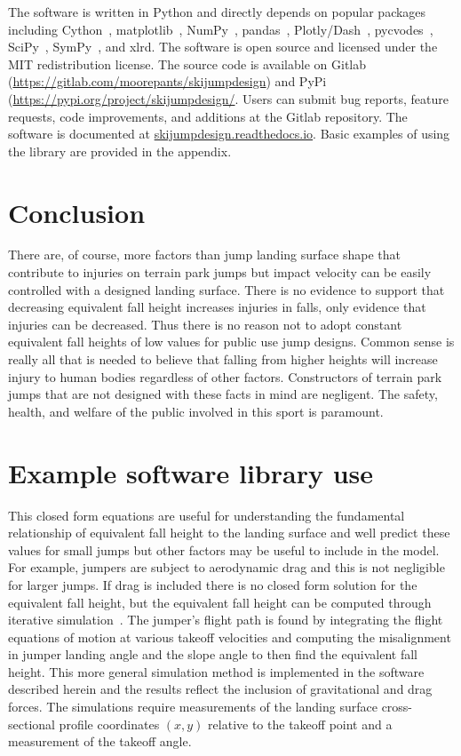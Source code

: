 \documentclass{article}
\begin{document}
The software is written in Python and directly depends on popular packages
including Cython~\cite{Behnel2011}, matplotlib~\cite{Hunter2007},
NumPy~\cite{Oliphant2006}, pandas~\cite{McKinney2020},
Plotly/Dash~\cite{Plotly2015}, pycvodes~\cite{Dahlgren2018},
SciPy~\cite{Virtanen2020}, SymPy~\cite{Meurer2017}, and xlrd.
The software is open source and licensed under the MIT redistribution license.
The source code is available on Gitlab
(\url{https://gitlab.com/moorepants/skijumpdesign}) and PyPi
(\url{https://pypi.org/project/skijumpdesign/}. Users can submit bug reports, feature
requests, code improvements, and additions at the Gitlab repository. The
software is documented at
\href{https://skijumpdesign.readthedocs.io}{skijumpdesign.readthedocs.io}.
Basic examples of using the library are provided in the appendix.

\section{Conclusion}
%
There are, of course, more factors than jump landing surface shape that
contribute to injuries on terrain park jumps but impact velocity can be easily
controlled with a designed landing surface. There is no evidence to support
that decreasing equivalent fall height increases injuries in falls, only
evidence that injuries can be decreased. Thus there is no reason not to adopt
constant equivalent fall heights of low values for public use jump designs.
Common sense is really all that is needed to believe that falling from higher
heights will increase injury to human bodies regardless of other factors.
Constructors of terrain park jumps that are not designed with these facts in
mind are negligent. The safety, health, and welfare of the public involved in
this sport is paramount.





\appendix

\section{Example software library use}
%
This closed form equations are useful for understanding the fundamental
relationship of equivalent fall height to the landing surface and well predict
these values for small jumps but other factors may be useful to include in the
model. For example, jumpers are subject to aerodynamic drag and this is not
negligible for larger jumps. If drag is included there is no closed form
solution for the equivalent fall height, but the equivalent fall height can be
computed through iterative simulation~\cite{Levy2015}. The jumper's flight path
is found by integrating the flight equations of motion at various takeoff
velocities and computing the misalignment in jumper landing angle and the slope
angle to then find the equivalent fall height. This more general simulation
method is implemented in the software described herein and the results reflect
the inclusion of gravitational and drag forces. The simulations require
measurements of the landing surface cross-sectional profile coordinates $(x,y)$
relative to the takeoff point and a measurement of the takeoff angle.
\end{document}

